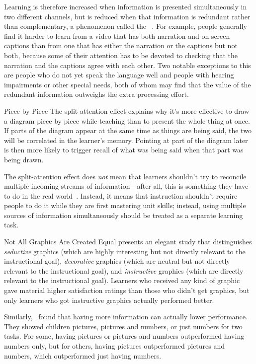 Learning is therefore increased when information is presented simultaneously in two different channels,
but is reduced when that information is redundant rather than complementary,
a phenomenon called the ~\cite{Maye2003}.
For example,
people generally find it harder to learn from a video that has both narration and on-screen captions
than from one that has either the narration or the captions but not both,
because some of their attention has to be devoted to checking
that the narration and the captions agree with each other.
Two notable exceptions to this are people who do not yet speak the language well
and people with hearing impairments or other special needs,
both of whom may find that the value of the redundant information
outweighs the extra processing effort.

\begin{aside}{Piece by Piece}
  The split attention effect explains why
  it's more effective to draw a diagram piece by piece while teaching
  than to present the whole thing at once.
  If parts of the diagram appear at the same time as things are being said,
  the two will be correlated in the learner's memory.
  Pointing at part of the diagram later
  is then more likely to trigger recall of what was being said when that part was being drawn.
\end{aside}

The split-attention effect does \emph{not} mean
that learners shouldn't try to reconcile multiple incoming streams of information---after all,
this is something they have to do in the real world~\cite{Atki2000}.
Instead,
it means that instruction shouldn't require people to do it
while they are first mastering unit skills;
instead,
using multiple sources of information simultaneously should be treated as a separate learning task.

\begin{aside}{Not All Graphics Are Created Equal}
  \cite{Sung2012} presents an elegant study that distinguishes \emph{seductive} graphics
  (which are highly interesting but not directly relevant to the instructional goal),
  \emph{decorative} graphics
  (which are neutral but not directly relevant to the instructional goal),
  and \emph{instructive} graphics
  (which are directly relevant to the instructional goal).
  Learners who received any kind of graphic gave material higher satisfaction ratings
  than those who didn't get graphics,
  but only learners who got instructive graphics actually performed better.

  Similarly,~\cite{Stam2013,Stam2014} found that
  having more information can actually lower performance.
  They showed children pictures, pictures and numbers, or just numbers for two tasks.
  For some,
  having pictures or pictures and numbers outperformed having numbers only,
  but for others,
  having pictures outperformed pictures and numbers,
  which outperformed just having numbers.
\end{aside}

